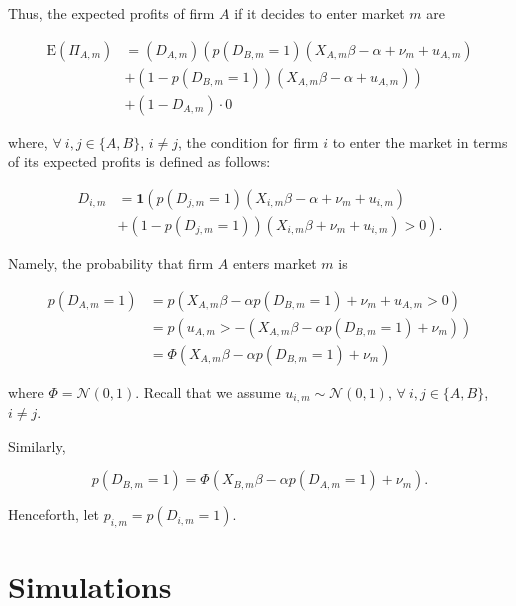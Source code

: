 \documentclass[cm,linguex]{glossa}
\newcommand{\ev}{\text{E}}
\newcommand{\dnorm}{\mathcal{N}}
\begin{document}
Thus, the expected profits of firm \(A\) if it decides to enter market
\(m\) are

\begin{align*}
    \ev\left(\Pi_{A, m}\right) & = \left( D_{A, m} \right) \left( p(D_{B, m} = 1) \left( X_{A, m} \beta - \alpha + \nu_m + u_{A, m} \right) \right. \\ &+ \left. \left( 1 - p(D_{B, m} = 1)\right) \left( X_{A, m} \beta - \alpha + u_{A, m} \right) \right) \\
    &+ \left( 1 - D_{A, m} \right) \cdot 0
\end{align*}

where, \(\forall\ i, j \in \{A, B\}\), \(i \neq j\), the condition for
firm \(i\) to enter the market in terms of its expected profits is
defined as follows:

\begin{align*}
    D_{i, m} & = \mathbf{1} \left( p(D_{j, m} = 1) \left( X_{i, m} \beta - \alpha + \nu_m + u_{i, m} \right) \right. \\ &+ \left. \left( 1 - p(D_{j, m} = 1) \right) \left( X_{i, m} \beta + \nu_m + u_{i, m} \right) > 0 \right) .
\end{align*}

Namely, the probability that firm \(A\) enters market \(m\) is

\begin{align*}
    p \left(D_{A, m} = 1\right) & = p \left( X_{A, m} \beta - \alpha p \left( D_{B, m} = 1 \right) + \nu_m + u_{A, m} > 0 \right)              \\
                                    & = p \left( u_{A, m} > - \left( X_{A, m} \beta - \alpha p \left( D_{B, m} = 1 \right) + \nu_m \right) \right) \\
                                    & = \Phi \left( X_{A, m} \beta - \alpha p \left( D_{B, m} = 1 \right) + \nu_m \right)                              
\end{align*}

where \(\Phi = \dnorm (0, 1)\). Recall that we assume
\(u_{i, m} \sim \dnorm(0, 1)\), \(\forall\ i, j \in \{A, B\}\),
\(i \neq j\).

Similarly,

\[
p \left( D_{B, m} = 1 \right) = \Phi \left( X_{B, m} \beta - \alpha p \left( D_{A, m} = 1 \right) + \nu_m \right) .
\]

Henceforth, let \(p_{i, m} = p(D_{i, m} = 1)\).

\newpage

\hypertarget{simulations}{%
\section{Simulations}\label{simulations}}
\end{document}
